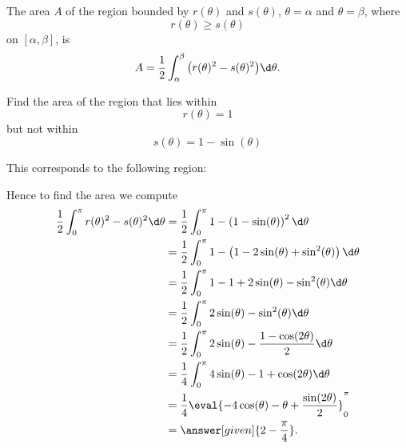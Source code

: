 \documentclass{ximera}
\begin{document}
\begin{theorem}
The area $A$ of the region bounded by $r(\theta)$ and $s(\theta)$,
$\theta=\alpha$ and $\theta=\beta$, where
\[
r(\theta)\ge s(\theta)
\]
on $[\alpha,\beta]$, is
\[
A = \frac{1}{2}\int_\alpha^\beta \big(r(\theta)^2-s(\theta)^2\big)\d \theta.
\]
\end{theorem}


\begin{example}
  Find the area of the region that lies within
  \[
  r(\theta) = 1
  \]
  but not within
  \[
  s(\theta) = 1-\sin(\theta)
  \]
  \begin{explanation}
    This corresponds to the following region:
    \begin{image}
    \end{image}
    Hence to find the area we compute
    \begin{align*}
      \frac{1}{2}\int_0^{\pi} r(\theta)^2 - s(\theta)^2 \d \theta &=  \frac{1}{2}\int_0^{\pi} 1 - \left(1-\sin(\theta)\right)^2 \d \theta \\
      &=  \frac{1}{2}\int_0^{\pi} 1 - \left(1 - 2\sin(\theta) + \sin^2(\theta)\right) \d \theta \\
      &=  \frac{1}{2}\int_0^{\pi} 1 -1 + 2\sin(\theta) - \sin^2(\theta) \d \theta \\
      &=  \frac{1}{2}\int_0^{\pi} 2\sin(\theta) - \sin^2(\theta) \d \theta \\
      &=  \frac{1}{2}\int_0^{\pi} 2\sin(\theta) - \frac{1-\cos(2\theta)}{2} \d \theta \\
      &=  \frac{1}{4}\int_0^{\pi} 4\sin(\theta) - 1+\cos(2\theta) \d \theta \\
      &=  \frac{1}{4}\eval{-4\cos(\theta) - \theta+\frac{\sin(2\theta)}{2}}_0^\pi \\
      &=  \answer[given]{2-\frac{\pi}{4}}.
    \end{align*}
  \end{explanation}
\end{example}
\end{document}
